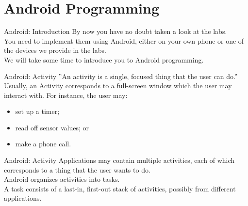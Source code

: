 \documentclass[aspectratio=169]{beamer}
\begin{document}
\section*{Android Programming}



\begin{frame}{Android: Introduction}
\large
By now you have no doubt taken a look at the labs. \\
\vspace{2em}
You need to implement them using Android, either on your own phone or one of the devices we provide in the labs. \\
\vspace{2em}
We will take some time to introduce you to Android programming.
\end{frame}



\begin{frame}{Android: Activity}
\large
''An activity is a single, focused thing that the user can do.'' \\
\vspace{2em}
Usually, an Activity corresponds to a full-screen window which 
the user may interact with. For instance, the user may:
\begin{itemize}
\item set up a timer; 
\item read off sensor values; or
\item make a phone call.
\end{itemize}
\end{frame}



\begin{frame}{Android: Activity}
\large
Applications may contain multiple activities, each of which corresponds to a thing that the user wants to do. \\
\vspace{2em}
Android organizes activities into tasks.  \\
\vspace{2em}
A task consists of a last-in, first-out stack of activities, possibly from different applications.
\end{frame}
\end{document}
